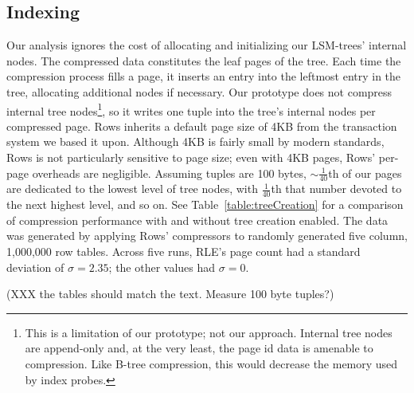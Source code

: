 \documentclass{sig-alternate-sigmod08}
\newcommand{\rows}{Rows\xspace}
\newcommand{\rowss}{Rows'\xspace}
\begin{document}
\subsection{Indexing}

Our analysis ignores the cost of allocating and initializing our
LSM-trees' internal nodes.  The compressed data constitutes the leaf
pages of the tree.  Each time the compression process fills a page, it
inserts an entry into the leftmost entry in the tree, allocating
additional nodes if necessary.  Our prototype does not compress
internal tree nodes\footnote{This is a limitation of our prototype;
  not our approach.  Internal tree nodes are append-only and, at the
  very least, the page id data is amenable to compression. Like B-tree
  compression, this would decrease the memory used by index probes.},
so it writes one tuple into the tree's internal nodes per compressed
page.  \rows inherits a default page size of 4KB from the transaction
system we based it upon.  Although 4KB is fairly small by modern
standards, \rows is not particularly sensitive to page size; even with
4KB pages, \rowss per-page overheads are negligible.  Assuming tuples
are 100 bytes, $\sim\frac{1}{40}$th of our pages are dedicated to the
lowest level of tree nodes, with $\frac{1}{40}$th that number devoted
to the next highest level, and so on.  See
Table~\ref{table:treeCreation} for a comparison of compression
performance with and without tree creation enabled.  The data was
generated by applying \rowss compressors to randomly generated five
column, 1,000,000 row tables.  Across five runs, RLE's page count had
a standard deviation of $\sigma=2.35$; the other values had
$\sigma=0$.

(XXX the tables should match the text.  Measure 100 byte tuples?)

\end{document}
